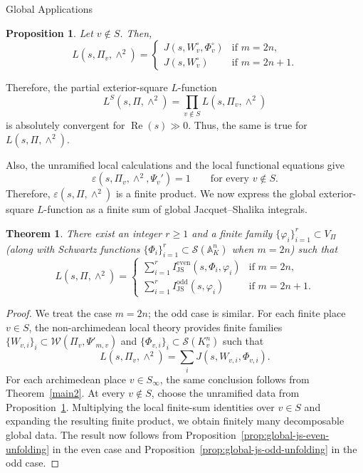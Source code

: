 \documentclass[12pt,reqno]{amsart}
\numberwithin{equation}{section}%
\numberwithin{equation}{subsection}
\newtheorem{thm}[equation]{Theorem}%
\newtheorem{prop}[equation]{Proposition}
\theoremstyle{definition}
\theoremstyle{remark}
\begin{document}
\begin{section}{Global Applications}
\begin{prop}\label{unramified-exterior-square}
Let \(v\notin S\). Then,
\[L(s,\Pi_v,\wedge^2)=
\begin{cases}
 J(s,W_v^\circ,\Phi_v^\circ) & \text{if } m=2n,\\[6pt]
 J(s,W_v^\circ) & \text{if } m=2n+1.
\end{cases}
\]
\end{prop}

Therefore, the partial exterior-square \(L\)-function
\[
  L^S(s,\Pi,\wedge^2)
  =
  \prod_{v\notin S}L(s,\Pi_v,\wedge^2)
\]
is absolutely convergent for \(\operatorname{Re}(s)\gg0\). Thus,
the same is true for \(L(s,\Pi,\wedge^2)\).

Also, the unramified local calculations and the local functional
equations \cite{JS1990, KR2012, CM2015,Mat2014} give
\[
  \varepsilon(s,\Pi_v,\wedge^2,\Psi_v')
  =
  1
  \qquad\text{for every }v\notin S.
\]
Therefore, \(\varepsilon(s,\Pi,\wedge^2)\) is a finite product. We now express the global exterior-square \(L\)-function as a finite sum
of global Jacquet--Shalika integrals.

\begin{thm}\label{sum-global-exterior-square}
There exist an integer \(r\geq 1\) and a finite family
\(\{\varphi_i\}_{i=1}^r\subset V_\Pi\) (along with Schwartz functions
\(\{\Phi_i\}_{i=1}^r\subset\mathcal{S}(\mathbb{A}_K^n)\) when \(m=2n\))
such that
\[
L(s,\Pi,\wedge^2)
=
\begin{cases}
\displaystyle
\sum_{i=1}^r
I_{\mathrm{JS}}^{\mathrm{even}}(s,\Phi_i,\varphi_i)
& \text{if } m=2n,\\[6pt]
\displaystyle
\sum_{i=1}^r
I_{\mathrm{JS}}^{\mathrm{odd}}(s,\varphi_i)
& \text{if } m=2n+1.
\end{cases}
\]
\end{thm}

\begin{proof}
We treat the case \(m=2n\); the odd case is similar. For each finite
place \(v\in S\), the non-archimedean local theory
\cite{KR2012,Jo2020} provides finite families
\(\{W_{v,i}\}_i\subset\mathcal{W}(\Pi_v,\Psi'_{m,v})\) and
\(\{\Phi_{v,i}\}_i\subset\mathcal{S}(K_v^n)\) such that
\[
L(s,\Pi_v,\wedge^2)
=
\sum_i J(s,W_{v,i},\Phi_{v,i}).
\]
For each archimedean place \(v\in S_\infty\), the same conclusion follows
from Theorem~\ref{main2}. At every \(v\notin S\), choose the unramified data from
Proposition~\ref{unramified-exterior-square}. Multiplying the local finite-sum identities over \(v\in S\) and expanding the resulting finite product, we obtain
finitely many decomposable global data. The result now follows from
Proposition~\ref{prop:global-js-even-unfolding} in the even case and Proposition~\ref{prop:global-js-odd-unfolding} in the odd
case.
\end{proof}


\end{section}
\end{document}
